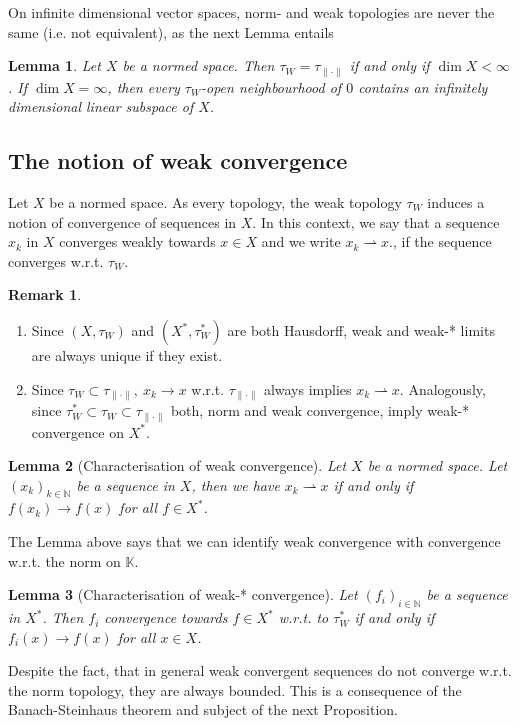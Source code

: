 \documentclass[11pt,a4paper]{article}
\newtheorem{lem}{Lemma}[section]
\theoremstyle{definition}
\newtheorem{rem}{Remark}[section]
\newcommand{\wto}{\rightharpoonup}
\begin{document}
\newpage
\noindent On infinite dimensional vector spaces, norm- and weak topologies are never the same (i.e. not equivalent), as the next Lemma entails
\begin{lem} Let $X$ be a normed space. Then $\tau_W = \tau_{\| \cdot \|}$ if and only if $\dim X < \infty$. If $\dim X = \infty$, then every $\tau_W$-open neighbourhood of $0$ contains an infinitely dimensional linear subspace of $X$. 
\end{lem}
\subsection{The notion of weak convergence}
Let $X$ be a normed space. As every topology, the weak topology $\tau_W$ induces a notion of convergence of sequences in $X$. In this context, we say that a sequence $x_k$ in $X$ converges weakly towards $x \in X$ and we write $x_k \rightharpoonup x.$, if the sequence converges w.r.t. $\tau_W$. 
\begin{rem} \
\begin{enumerate}
\item Since $(X, \tau_W)$ and $(X^*, \tau_W^*)$ are both Hausdorff, weak and weak-* limits are always unique if they exist. 
\item Since $\tau_W \subset \tau_{\| \cdot \|}, \ x_k \to x$ w.r.t. $\tau_{\| \cdot \|}$ always implies $x_k \wto x$. Analogously, since $\tau_W^* \subset \tau_W \subset \tau_{\| \cdot \|}$ both, norm and weak convergence, imply weak-* convergence on $X^*$. 
\end{enumerate}
\end{rem}
\begin{lem}[Characterisation of weak convergence] Let $X$ be a normed space. Let $(x_k)_{k \in \mathbb{N}}$ be a sequence in $X$, then we have $x_k \wto x$ if and only if $f(x_k) \to f(x)$ for all $f \in X^*$.
\end{lem}
\noindent The Lemma above says that we can identify weak convergence with convergence w.r.t. the norm on $\mathbb{K}$. 
\begin{lem}[Characterisation of weak-* convergence] Let $(f_i)_{i \in \mathbb{N}}$ be a sequence in $X^*$. Then $f_i$ convergence towards $f \in X^*$ w.r.t. to $\tau_W^*$ if and only if $f_i(x) \to f(x)$ for all $x \in X$.
\end{lem}
\noindent Despite the fact, that in general weak convergent sequences do not converge w.r.t. the norm topology, they are always bounded. This is a consequence of the Banach-Steinhaus theorem and subject of the next Proposition. 
\end{document}
